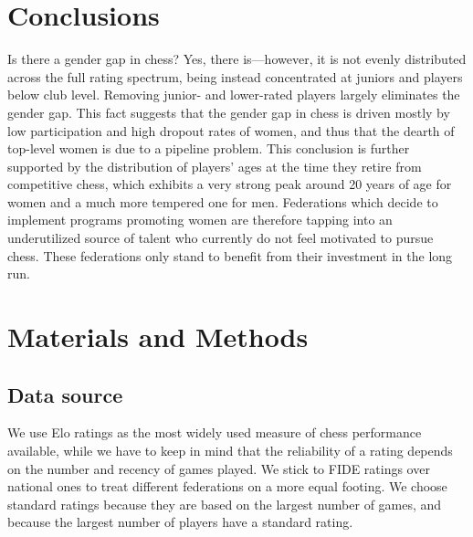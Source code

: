 \documentclass[9pt,twocolumn,twoside,lineno]{pnas-new}
\newcommand{\MM}{Materials and Methods}
\begin{document}
\section*{Conclusions}

Is there a gender gap in chess? Yes, there is---however, it is not evenly distributed across the full rating spectrum, being instead concentrated at juniors and players below club level. Removing junior- and lower-rated players largely eliminates the gender gap. This fact suggests that the gender gap in chess is driven mostly by low participation and high dropout rates of women, and thus that the dearth of top-level women is due to a pipeline problem. This conclusion is further supported by the distribution of players' ages at the time they retire from competitive chess, which exhibits a very strong peak around 20 years of age for women and a much more tempered one for men. Federations which decide to implement programs promoting women are therefore tapping into an underutilized source of talent who currently do not feel motivated to pursue chess. These federations only stand to benefit from their investment in the long run.



\section*{\MM}

\subsection*{Data source}

We use Elo ratings as the most widely used measure of chess performance available, while we have to keep in mind that the reliability of a rating depends on the number and recency of games played. We stick to FIDE ratings over national ones to treat different federations on a more equal footing. We choose standard ratings because they are based on the largest number of games, and because the largest number of players have a standard rating.
\end{document}
